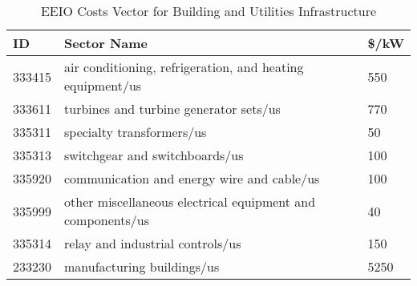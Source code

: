 \begin{table}[h]
\centering
\begin{tabular}{|l|l|l|} \hline

\bf{ID} & \bf{Sector Name} & \bf{\$/kW}  \\ \hline

333415 & air conditioning, refrigeration, and heating equipment/us & 550 \\ \hline
333611 & turbines and turbine generator sets/us & 770 \\ \hline
335311 & specialty transformers/us & 50 \\ \hline
335313 & switchgear and switchboards/us & 100 \\ \hline
335920 & communication and energy wire and cable/us & 100 \\ \hline
335999 & other miscellaneous electrical equipment and components/us & 40 \\ \hline
335314 & relay and industrial controls/us & 150 \\ \hline
233230 & manufacturing buildings/us & 5250 \\ \hline

\end{tabular}
\caption{EEIO Costs Vector for Building and Utilities Infrastructure}
\label{tab:eeio_y_building_table}
\end{table}


